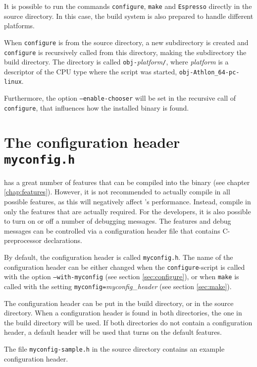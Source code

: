 It is possible to run the commands \texttt{configure}, \texttt{make}
and \texttt{Espresso} directly in the source directory. In this case,
the \es{} build system is also prepared to handle different platforms.

When \texttt{configure} is from the source directory, a new
subdirectory is created and \texttt{configure} is recursively called
from this directory, making the subdirectory the build directory.  The
directory is called \texttt{obj-}\textit{platform}\texttt{/}, where
\textit{platform} is a descriptor of the CPU type where the script was
started, \eg{} \texttt{obj-Athlon\_64-pc-linux}.

Furthermore, the option \texttt{--enable-chooser} will be set in the
recursive call of \texttt{configure}, that influences how the
installed \es{} binary is found.

\section{The configuration header \texttt{myconfig.h}}
\label{sec:myconfig}

  \es{} has a great
number of features that can be compiled into the binary (see chapter
\vref{chap:features}).  However, it is not recommended to actually
compile in all possible features, as this will negatively affect \es's
performance. Instead, compile in only the features that are actually
required. For the developers, it is also possible to turn on or off a
number of debugging messages. The features and debug messages can be
controlled via a configuration header file that contains
C-preprocessor declarations.

By default, the configuration header is called \texttt{myconfig.h}.
The name of the configuration header can be either changed when the
\texttt{configure}-script is called with the option
\texttt{--with-myconfig} (see section \vref{sec:configure}), or when
\texttt{make} is called with the setting
\texttt{myconfig=}\textit{myconfig\_header} (see section
\vref{sec:make}).

The configuration header can be put in the build directory, or in the
source directory. When a configuration header is found in both
directories, the one in the build directory will be used. If both
directories do not contain a configuration header, a default header
will be used that turns on the default features.

The file \texttt{myconfig-sample.h} in the source directory contains
an example configuration header.

